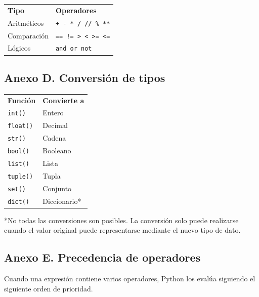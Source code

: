 \documentclass[11pt,a5paper,twoside]{book}
\begin{document}
\begin{tcolorbox}
\begin{tabular}{ll}
 \textbf{Tipo}         &  \textbf{Operadores}         \\
 Aritméticos  &  {\scriptsize \texttt{+ - * / // \% **}}  \\
 Comparación  &  {\scriptsize \texttt{== != \textgreater{} \textless{} \textgreater{}= \textless{}=}}  \\
 Lógicos      &  {\scriptsize \texttt{and or not}}       \\
\end{tabular}
\end{tcolorbox}

\newpage
\subsection{Anexo D. Conversión de tipos}

\begin{tcolorbox}
\begin{tabular}{ll}
 \textbf{Función}    &  \textbf{Convierte a}   \\
 {\scriptsize \texttt{int()}}    &  Entero        \\
 {\scriptsize \texttt{float()}}  &  Decimal       \\
 {\scriptsize \texttt{str()}}    &  Cadena        \\
 {\scriptsize \texttt{bool()}}   &  Booleano      \\
 {\scriptsize \texttt{list()}}   &  Lista         \\
 {\scriptsize \texttt{tuple()}}  &  Tupla         \\
 {\scriptsize \texttt{set()}}    &  Conjunto      \\
 {\scriptsize \texttt{dict()}}   &  Diccionario*  \\
\end{tabular}
\end{tcolorbox}
*No todas las conversiones son posibles. La conversión solo puede realizarse cuando el valor original puede representarse mediante el nuevo tipo de dato.

\newpage
\subsection{Anexo E. Precedencia de operadores}
Cuando una expresión contiene varios operadores, Python los evalúa siguiendo el siguiente orden de prioridad.
\end{document}

